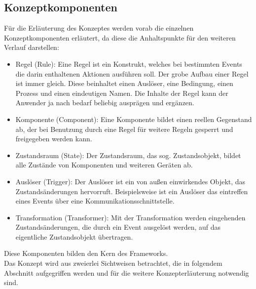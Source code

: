     \subsection{Konzeptkomponenten}
    \label{subsec:conceptcomps}
        Für die Erläuterung des Konzeptes werden vorab die einzelnen Konzeptkomponenten erläutert, da diese die Anhaltspunkte 
        für den weiteren Verlauf darstellen: %
        \begin{itemize} 
            \item Regel (Rule): Eine Regel ist ein Konstrukt, welches bei bestimmten Events die darin enthaltenen Aktionen ausführen soll. 
            Der grobe Aufbau einer Regel ist immer gleich. Diese beinhaltet einen Auslöser, eine Bedingung, einen Prozess und einen eindeutigen 
            Namen. Die Inhalte der Regel kann der Anwender ja nach bedarf beliebig ausprägen und ergänzen. 
            \item Komponente (Component): Eine Komponente bildet einen reellen Gegenstand ab, der bei Benutzung durch eine Regel für weitere Regeln 
            gesperrt und freigegeben werden kann. 
            \item Zustandsraum (State): Der Zustandsraum, das sog. Zustandsobjekt, bildet alle Zustände von Komponenten und weiteren Geräten ab. 
            \item Auslöser (Trigger): Der Auslöser ist ein von außen einwirkendes Objekt, das Zustandsänderungen hervorruft. Beispielsweise ist ein 
            Auslöser das eintreffen eines Events über eine Kommunikationsschnittstelle.
            \item Transformation (Transformer): Mit der Transformation werden eingehenden Zustandsänderungen, die durch ein Event ausgelöst werden, 
            auf das eigentliche Zustandsobjekt übertragen. 
        \end{itemize}
        Diese Komponenten bilden den Kern des Frameworks.
        \\
        Das Konzept wird aus zweierlei Sichtweisen betrachtet, die in folgendem Abschnitt aufgegriffen werden und für die weitere 
        Konzepterläuterung notwendig sind.
    
